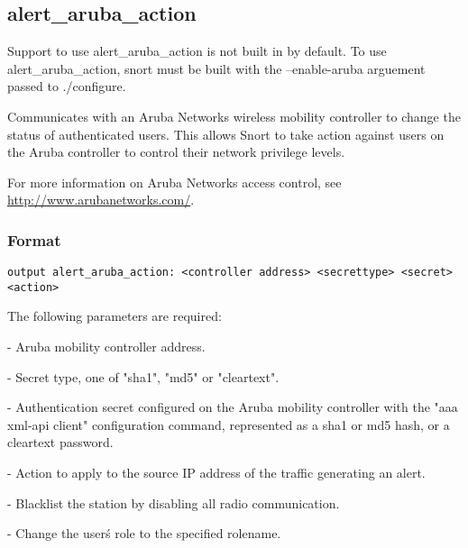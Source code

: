 \documentclass[english]{report}
\newenvironment{note}{
\samepage
    \vspace{10pt}{\textsf{
        {\hspace{7pt}\Huge{$\triangle$\hspace{-12.5pt}{\Large{$^!$}}}}\hspace{5pt}
        {\Large{NOTE}}
    }
    }
   \begin{center}
    \par\vspace{-17pt}

    \begin{lrbox}{\savepar}
    \begin{minipage}[r]{6in}
}
{
    \end{minipage}
    \end{lrbox}
    \fbox{
        \usebox{
            \savepar
	}
    }
    \par\vskip10pt
    \end{center}
}
\newenvironment{note}{
        \begin{rawhtml}
        <p><table border="1"><tr><td><b>
        Note:&nbsp;&nbsp;</b>
        \end{rawhtml}
}{
        \begin{rawhtml}
        </b></td></tr></table></p>
        \end{rawhtml}
}
\begin{document}
\subsection{alert\_aruba\_action}

\begin{note}
Support to use alert\_aruba\_action is not built in by default.  To
use alert\_aruba\_action, snort must be built with the --enable-aruba
arguement passed to ./configure.
\end{note}

Communicates with an Aruba Networks wireless mobility controller to
change the status of authenticated users.  This allows Snort to take
action against users on the Aruba controller to control their network
privilege levels.

For more information on Aruba Networks access control, see
\url{http://www.arubanetworks.com/}.

\subsubsection{Format}

\begin{verbatim}
output alert_aruba_action: <controller address> <secrettype> <secret> <action>
\end{verbatim}
%
The following parameters are required:

\begin{description}{}
\item [\texttt{controller address}] - Aruba mobility controller address.
\item [\texttt{secrettype}] - Secret type, one of "sha1", "md5" or "cleartext".
\item [\texttt{secret}] - Authentication secret configured on the Aruba mobility controller with the "aaa xml-api client" configuration command, represented as a sha1 or md5 hash, or a cleartext password.
\item [\texttt{action}] - Action to apply to the source IP address of the traffic generating an alert.

  \begin{description}{}
      \item [\texttt{blacklist}]- Blacklist the station by disabling all radio communication.
      \item [\texttt{setrole:rolename}]- Change the user\'s role to the specified rolename.
  \end{description}
\end{description}
\end{document}
